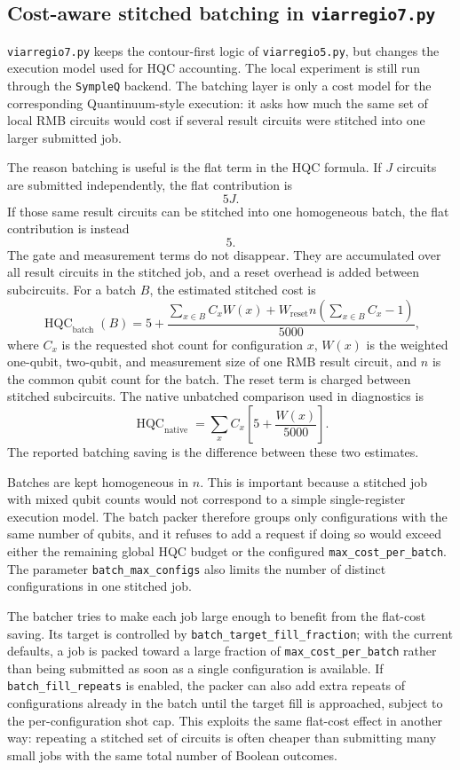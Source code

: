 \subsection{Cost-aware stitched batching in \texttt{viarregio7.py}}

\texttt{viarregio7.py} keeps the contour-first logic of
\texttt{viarregio5.py}, but changes the execution model used for HQC
accounting.  The local experiment is still run through the \texttt{SympleQ}
backend.  The batching layer is only a cost model for the corresponding
Quantinuum-style execution: it asks how much the same set of local RMB circuits
would cost if several result circuits were stitched into one larger submitted
job.

The reason batching is useful is the flat term in the HQC formula.  If \(J\)
circuits are submitted independently, the flat contribution is
\[
    5J.
\]
If those same result circuits can be stitched into one homogeneous batch, the
flat contribution is instead
\[
    5.
\]
The gate and measurement terms do not disappear.  They are accumulated over all
result circuits in the stitched job, and a reset overhead is added between
subcircuits.  For a batch \(B\), the estimated stitched cost is
\[
    \operatorname{HQC}_{\mathrm{batch}}(B)
    =
    5
    +
    \frac{
        \sum_{x\in B} C_x W(x)
        +
        W_{\mathrm{reset}} n \left(\sum_{x\in B} C_x - 1\right)
    }{5000},
\]
where \(C_x\) is the requested shot count for configuration \(x\), \(W(x)\) is
the weighted one-qubit, two-qubit, and measurement size of one RMB result
circuit, and \(n\) is the common qubit count for the batch.  The reset term is
charged between stitched subcircuits.  The native unbatched comparison used in
diagnostics is
\[
    \operatorname{HQC}_{\mathrm{native}}
    =
    \sum_x C_x
    \left[
        5 + \frac{W(x)}{5000}
    \right].
\]
The reported batching saving is the difference between these two estimates.

Batches are kept homogeneous in \(n\).  This is important because a stitched
job with mixed qubit counts would not correspond to a simple single-register
execution model.  The batch packer therefore groups only configurations with
the same number of qubits, and it refuses to add a request if doing so would
exceed either the remaining global HQC budget or the configured
\texttt{max\_cost\_per\_batch}.  The parameter
\texttt{batch\_max\_configs} also limits the number of distinct configurations
in one stitched job.

The batcher tries to make each job large enough to benefit from the flat-cost
saving.  Its target is controlled by \texttt{batch\_target\_fill\_fraction};
with the current defaults, a job is packed toward a large fraction of
\texttt{max\_cost\_per\_batch} rather than being submitted as soon as a single
configuration is available.  If \texttt{batch\_fill\_repeats} is enabled, the
packer can also add extra repeats of configurations already in the batch until
the target fill is approached, subject to the per-configuration shot cap.  This
exploits the same flat-cost effect in another way: repeating a stitched set of
circuits is often cheaper than submitting many small jobs with the same total
number of Boolean outcomes.

